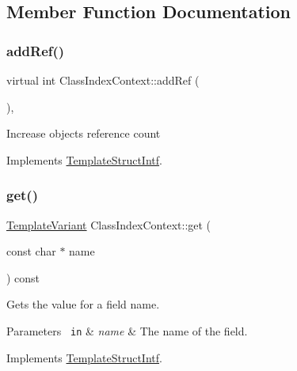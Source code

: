 \subsection{Member Function Documentation}
\mbox{\label{class_class_index_context_a0bf6831cd085ad22ded6b29bfcb8f0bd}} 
\subsubsection{\texorpdfstring{addRef()}{addRef()}}
{\footnotesize\ttfamily virtual int Class\+Index\+Context\+::add\+Ref (\begin{DoxyParamCaption}{ }\end{DoxyParamCaption})\hspace{0.3cm}{\ttfamily [inline]}, {\ttfamily [virtual]}}

Increase object\textquotesingle{}s reference count 

Implements \mbox{\hyperlink{class_template_struct_intf_a05fe97ad47633beb326f69686faed581}{Template\+Struct\+Intf}}.

\mbox{\label{class_class_index_context_a5353dbdd14faccb6f1e8a7487cf061b0}} 
\subsubsection{\texorpdfstring{get()}{get()}}
{\footnotesize\ttfamily \mbox{\hyperlink{class_template_variant}{Template\+Variant}} Class\+Index\+Context\+::get (\begin{DoxyParamCaption}\item[{const char $\ast$}]{name }\end{DoxyParamCaption}) const\hspace{0.3cm}{\ttfamily [virtual]}}

Gets the value for a field name. 
\begin{DoxyParams}[1]{Parameters}
\mbox{\texttt{ in}}  & {\em name} & The name of the field. \\
\hline
\end{DoxyParams}


Implements \mbox{\hyperlink{class_template_struct_intf_a3d610cb81b4adbb531ebed3aa3d09b51}{Template\+Struct\+Intf}}.

